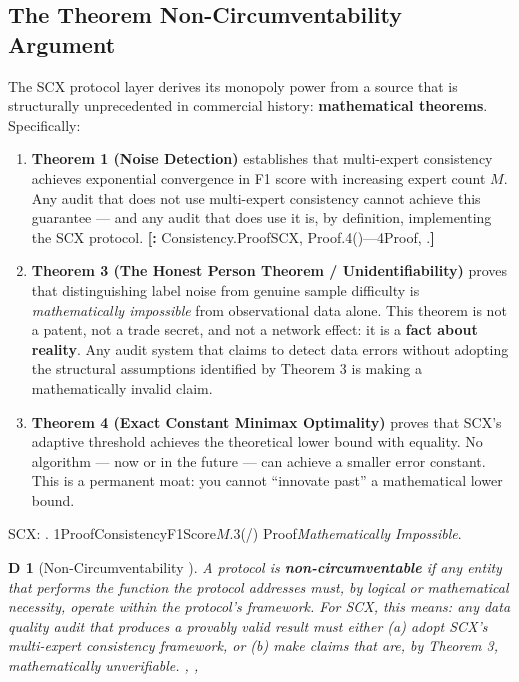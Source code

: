 \documentclass[12pt,a4paper]{article}
\newtheorem{definition}[theorem]Definition
\theoremstyle{remark}
\begin{document}
\subsection{The Theorem Non-Circumventability Argument}
The SCX protocol layer derives its monopoly power from a source that is structurally 
unprecedented in commercial history: \textbf{mathematical theorems}. Specifically:
\begin{enumerate}[label=(\arabic*), leftmargin=*]
 \item \textbf{Theorem 1 (Noise Detection)} establishes that multi-expert consistency 
 achieves exponential convergence in F1 score with increasing expert count $M$.
 Any audit that does not use multi-expert consistency cannot achieve 
 this guarantee --- and any audit that does use it is, by definition, 
 implementing the SCX protocol. \textbf{[:} Consistency\emph{}.ProofSCX\emph{}, Proof\emph{}.4()---4Proof\emph{}, \emph{}.\textbf{]}
 \item \textbf{Theorem 3 (The Honest Person Theorem / Unidentifiability)} proves that 
 distinguishing label noise from genuine sample difficulty is \textit{mathematically 
 impossible} from observational data alone. This theorem is not a patent, not a 
 trade secret, and not a network effect: it is a \textbf{fact about reality}. 
 Any audit system that claims to detect data errors without adopting the structural 
 assumptions identified by Theorem 3 is making a mathematically invalid claim.
 \item \textbf{Theorem 4 (Exact Constant Minimax Optimality)} proves that SCX's adaptive 
 threshold achieves the theoretical lower bound with equality. No algorithm --- 
 now or in the future --- can achieve a smaller error constant. This is a permanent 
 moat: you cannot ``innovate past'' a mathematical lower bound.
\end{enumerate}
SCX: .
1ProofConsistencyF1Score$M$.3(/)
Proof\textit{Mathematically Impossible}.
\begin{definition}[Non-Circumventability ]
A protocol is \textbf{non-circumventable} if any entity that performs the function 
the protocol addresses \textit{must}, by logical or mathematical necessity, operate 
within the protocol's framework. For SCX, this means: any data quality audit that 
produces a provably valid result must either (a) adopt SCX's multi-expert consistency 
framework, or (b) make claims that are, by Theorem 3, mathematically unverifiable.
\small , \textit{}, 
\end{definition}
\end{document}
